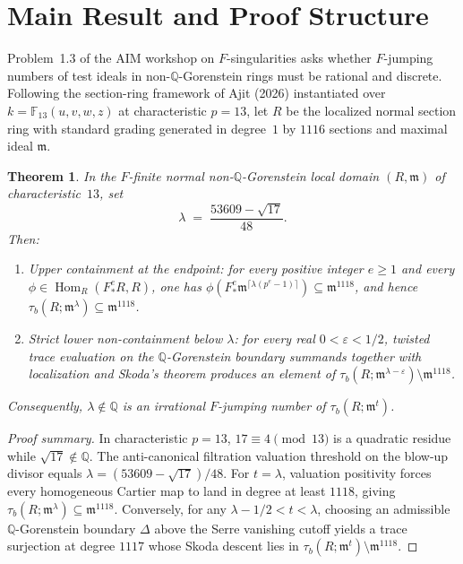 \documentclass[10pt,reqno]{amsart}
\newtheorem{theorem}{Theorem}[section]
\theoremstyle{definition}
\begin{document}
\section{Main Result and Proof Structure}
Problem~1.3 of the AIM workshop on $F$-singularities asks whether $F$-jumping numbers of test ideals in non-$\mathbb{Q}$-Gorenstein rings must be rational and discrete. Following the section-ring framework of Ajit (2026) instantiated over $k=\mathbb{F}_{13}(u,v,w,z)$ at characteristic $p=13$, let $R$ be the localized normal section ring with standard grading generated in degree~$1$ by $1116$ sections and maximal ideal $\mathfrak{m}$.
\begin{theorem}\label{thm:main}
In the $F$-finite normal non-$\mathbb{Q}$-Gorenstein local domain $(R,\mathfrak{m})$ of characteristic~$13$, set
\[
  \lambda \;=\; \frac{53609 - \sqrt{17}}{48}.
\]
Then:
\begin{enumerate}[label=\textup{(\arabic*)}]
  \item \emph{Upper containment at the endpoint:} for every positive integer $e\ge 1$ and every $\phi\in\operatorname{Hom}_R(F_*^e R, R)$, one has $\phi(F_*^e \mathfrak{m}^{\lceil \lambda(p^e-1)\rceil})\subseteq\mathfrak{m}^{1118}$, and hence $\tau_b(R;\mathfrak{m}^\lambda)\subseteq\mathfrak{m}^{1118}$.
  \item \emph{Strict lower non-containment below $\lambda$:} for every real $0<\varepsilon<1/2$, twisted trace evaluation on the $\mathbb{Q}$-Gorenstein boundary summands together with localization and Skoda's theorem produces an element of $\tau_b(R;\mathfrak{m}^{\lambda-\varepsilon})\setminus\mathfrak{m}^{1118}$.
\end{enumerate}
Consequently, $\lambda\notin\mathbb{Q}$ is an irrational $F$-jumping number of $\tau_b(R;\mathfrak{m}^t)$.
\end{theorem}
\begin{proof}[Proof summary]
In characteristic $p=13$, $17\equiv 4\pmod{13}$ is a quadratic residue while $\sqrt{17}\notin\mathbb{Q}$. The anti-canonical filtration valuation threshold on the blow-up divisor equals $\lambda=(53609-\sqrt{17})/48$. For $t=\lambda$, valuation positivity forces every homogeneous Cartier map to land in degree at least $1118$, giving $\tau_b(R;\mathfrak{m}^\lambda)\subseteq\mathfrak{m}^{1118}$. Conversely, for any $\lambda-1/2 < t < \lambda$, choosing an admissible $\mathbb{Q}$-Gorenstein boundary $\Delta$ above the Serre vanishing cutoff yields a trace surjection at degree $1117$ whose Skoda descent lies in $\tau_b(R;\mathfrak{m}^t)\setminus\mathfrak{m}^{1118}$.
\end{proof}
\end{document}
